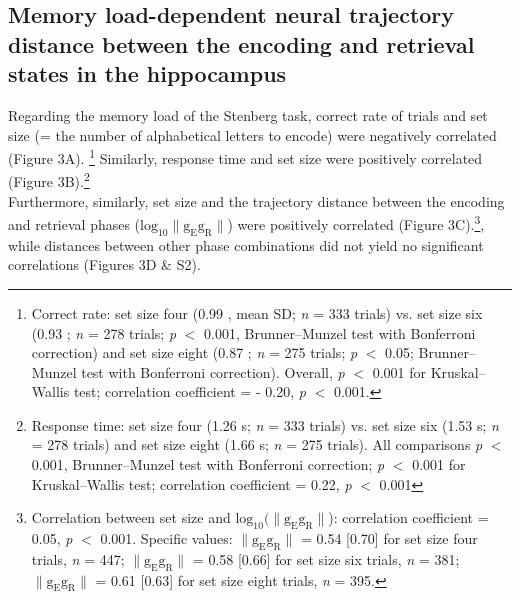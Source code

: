 \subsection{Memory load-dependent neural trajectory distance between the encoding and retrieval states in the hippocampus}
Regarding the memory load of the Stenberg task, correct rate of trials and set size (= the number of alphabetical letters to encode) were negatively correlated (Figure 3A). \footnote{Correct rate: set size four (0.99 , mean \textpm SD; \textit{n} = 333 trials) vs. set size six (0.93 ; \textit{n} = 278 trials; \textit{p} $<$ 0.001, Brunner--Munzel test with Bonferroni correction) and set size eight (0.87 ; \textit{n} = 275 trials; \textit{p} $<$ 0.05; Brunner--Munzel test with Bonferroni correction). Overall, \textit{p} $<$ 0.001 for Kruskal--Wallis test; correlation coefficient = - 0.20, \textit{p} $<$ 0.001.} Similarly, response time and set size were positively correlated (Figure 3B).\footnote{Response time: set size four (1.26  s; \textit{n} = 333 trials) vs. set size six (1.53  s; \textit{n} = 278 trials) and set size eight (1.66  s; \textit{n} = 275 trials). All comparisons \textit{p} $<$ 0.001, Brunner--Munzel test with Bonferroni correction; \textit{p} $<$ 0.001 for Kruskal--Wallis test; correlation coefficient = 0.22, \textit{p} $<$ 0.001}
\\
\indent
Furthermore, similarly, set size and the trajectory distance between the encoding and retrieval phases ($\mathrm{log_{10}\lVert g_{E}g_{R} \rVert}$) were positively correlated (Figure 3C).\footnote{Correlation between set size and $\mathrm{log_{10}(\lVert g_{E}g_{R} \rVert}$): correlation coefficient = 0.05, \textit{p} $<$ 0.001. Specific values: $\mathrm{\lVert g_{E}g_{R} \rVert}$ = 0.54 [0.70] for set size four trials, \textit{n} = 447; $\mathrm{\lVert g_{E}g_{R} \rVert}$ = 0.58 [0.66] for set size six trials, \textit{n} = 381; $\mathrm{\lVert g_{E}g_{R} \rVert}$ = 0.61 [0.63] for set size eight trials, \textit{n} = 395.}, while distances between other phase combinations did not yield no significant correlations (Figures 3D \& S2).

